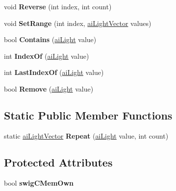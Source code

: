 \begin{DoxyCompactItemize}
\item 
\hypertarget{classai_light_vector_a0fac72c5639d9f91954c6ec9d019d51a}{void {\bfseries Reverse} (int index, int count)}\label{classai_light_vector_a0fac72c5639d9f91954c6ec9d019d51a}

\item 
\hypertarget{classai_light_vector_a0d88db5aee66d274421a86339d94e078}{void {\bfseries Set\+Range} (int index, \hyperlink{classai_light_vector}{ai\+Light\+Vector} values)}\label{classai_light_vector_a0d88db5aee66d274421a86339d94e078}

\item 
\hypertarget{classai_light_vector_a15315e67335c92ec35f8472dae833e66}{bool {\bfseries Contains} (\hyperlink{structai_light}{ai\+Light} value)}\label{classai_light_vector_a15315e67335c92ec35f8472dae833e66}

\item 
\hypertarget{classai_light_vector_af16cab4b0e8fcd8f746b2f7a5b3e1069}{int {\bfseries Index\+Of} (\hyperlink{structai_light}{ai\+Light} value)}\label{classai_light_vector_af16cab4b0e8fcd8f746b2f7a5b3e1069}

\item 
\hypertarget{classai_light_vector_a9f4002b7ed309617e8e898328bd71781}{int {\bfseries Last\+Index\+Of} (\hyperlink{structai_light}{ai\+Light} value)}\label{classai_light_vector_a9f4002b7ed309617e8e898328bd71781}

\item 
\hypertarget{classai_light_vector_a99878af6b5c693f8eb0ed25320f5e420}{bool {\bfseries Remove} (\hyperlink{structai_light}{ai\+Light} value)}\label{classai_light_vector_a99878af6b5c693f8eb0ed25320f5e420}

\end{DoxyCompactItemize}
\subsection*{Static Public Member Functions}
\begin{DoxyCompactItemize}
\item 
\hypertarget{classai_light_vector_ac7936edf25905491ecff3ec9fafe05ce}{static \hyperlink{classai_light_vector}{ai\+Light\+Vector} {\bfseries Repeat} (\hyperlink{structai_light}{ai\+Light} value, int count)}\label{classai_light_vector_ac7936edf25905491ecff3ec9fafe05ce}

\end{DoxyCompactItemize}
\subsection*{Protected Attributes}
\begin{DoxyCompactItemize}
\item 
\hypertarget{classai_light_vector_ab4e26289b253bb9df9d55560c898a00b}{bool {\bfseries swig\+C\+Mem\+Own}}\label{classai_light_vector_ab4e26289b253bb9df9d55560c898a00b}

\end{DoxyCompactItemize}
